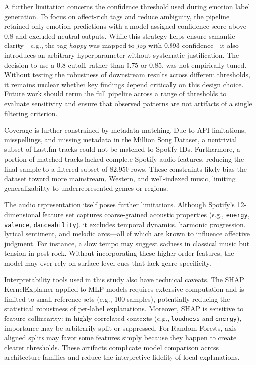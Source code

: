 \documentclass{article}
\begin{document}
A further limitation concerns the confidence threshold used during emotion label generation. To focus on affect-rich tags and reduce ambiguity, the pipeline retained only emotion predictions with a model-assigned confidence score above 0.8 and excluded neutral outputs. While this strategy helps ensure semantic clarity—e.g., the tag \textit{happy} was mapped to \textit{joy} with 0.993 confidence—it also introduces an arbitrary hyperparameter without systematic justification. The decision to use a 0.8 cutoff, rather than 0.75 or 0.85, was not empirically tuned. Without testing the robustness of downstream results across different thresholds, it remains unclear whether key findings depend critically on this design choice. Future work should rerun the full pipeline across a range of thresholds to evaluate sensitivity and ensure that observed patterns are not artifacts of a single filtering criterion.

Coverage is further constrained by metadata matching. Due to API limitations, misspellings, and missing metadata in the Million Song Dataset, a nontrivial subset of Last.fm tracks could not be matched to Spotify IDs. Furthermore, a portion of matched tracks lacked complete Spotify audio features, reducing the final sample to a filtered subset of 82,950 rows. These constraints likely bias the dataset toward more mainstream, Western, and well-indexed music, limiting generalizability to underrepresented genres or regions.

The audio representation itself poses further limitations. Although Spotify’s 12-dimensional feature set captures coarse-grained acoustic properties (e.g., \texttt{energy}, \texttt{valence}, \texttt{danceability}), it excludes temporal dynamics, harmonic progression, lyrical sentiment, and melodic arcs—all of which are known to influence affective judgment. For instance, a slow tempo may suggest sadness in classical music but tension in post-rock. Without incorporating these higher-order features, the model may over-rely on surface-level cues that lack genre specificity.

Interpretability tools used in this study also have technical caveats. The SHAP KernelExplainer applied to MLP models requires extensive computation and is limited to small reference sets (e.g., 100 samples), potentially reducing the statistical robustness of per-label explanations. Moreover, SHAP is sensitive to feature collinearity: in highly correlated contexts (e.g., \texttt{loudness} and \texttt{energy}), importance may be arbitrarily split or suppressed. For Random Forests, axis-aligned splits may favor some features simply because they happen to create clearer thresholds. These artifacts complicate model comparison across architecture families and reduce the interpretive fidelity of local explanations.
\end{document}
